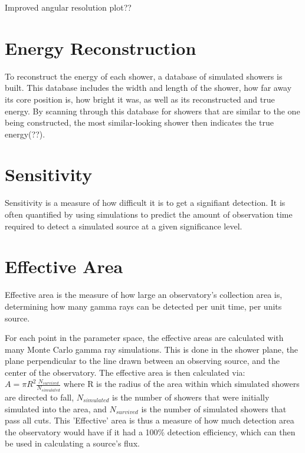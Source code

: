 Improved angular resolution plot??

\section{Energy Reconstruction}\label{subsec:enrecon}
To reconstruct the energy of each shower, a database of simulated showers is built.
This database includes the width and length of the shower, how far away its core position is, how bright it was, as well as its reconstructed and true energy.
By scanning through this database for showers that are similar to the one being constructed, the most similar-looking shower then indicates the true energy(??).



\section{Sensitivity}
Sensitivity is a measure of how difficult it is to get a signifiant detection.
It is often quantified by using simulations to predict the amount of observation time required to detect a simulated source at a given significance level.


\section{Effective Area}
Effective area is the measure of how large an observatory's collection area is, determining how many gamma rays can be detected per unit time, per units source.

For each point in the parameter space, the effective areas are calculated with many Monte Carlo gamma ray simulations.
This is done in the shower plane, the plane perpendicular to the line drawn between an observing source, and the center of the observatory.
The effective area is then calculated via:
$A=\pi R^2 \frac{N_{survived}}{N_{simulated}}$
where R is the radius of the area within which simulated showers are directed to fall, $N_{simulated}$ is the number of showers that were initially simulated into the area, and $N_{survived}$ is the number of simulated showers that pass all cuts.
This 'Effective' area is thus a measure of how much detection area the observatory would have if it had a 100\% detection efficiency, which can then be used in calculating a source's flux.




